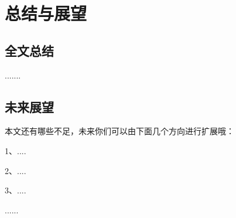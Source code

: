 \chapter{总结与展望}

\section{全文总结}

.......


\section{未来展望}

本文还有哪些不足，未来你们可以由下面几个方向进行扩展哦：

1、....


2、....


3、....


......